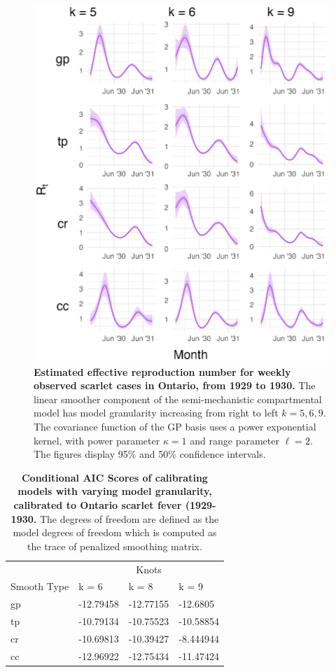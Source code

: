 \documentclass[
11pt, %
oneside, %
english, %
singlespacing, %
]{macthesis} %
\begin{document}
\begin{figure}[H]
\centering
\includegraphics[width=\textwidth, height = \textwidth]{figure/Scarlet/Scarlet_agg_k(5,8,10)_bsd1_beta1_gamma7_sd01_plot_R_t.png}
\caption[Estimated Scarlet Fever Effective Reproduction Number (1929-1930)]{\textbf{Estimated effective reproduction number for weekly observed scarlet cases in Ontario, from 1929 to 1930.} The linear smoother component of the semi-mechanistic compartmental model has model granularity increasing from right to left \(k= 5,6,9\). The covariance function of the GP basis uses a power exponential kernel, with power parameter \(\kappa = 1\) and range parameter \(\ell = 2\). The figures display 95\% and 50\% confidence intervals.}
\label{fig:scarlet_rt}
\end{figure}

\begin{table}[!h]
\centering
\caption{\label{tab:aic-table-scarlet}\textbf{Conditional AIC Scores of calibrating models with varying model granularity, calibrated to Ontario scarlet fever (1929-1930.} The degrees of freedom are defined as the model degrees of freedom which is computed as the trace of penalized smoothing matrix.}
\centering
\begin{tabular}[t]{llll}
\toprule
\multicolumn{1}{c}{ } & \multicolumn{3}{c}{Knots} \\
\cmidrule(l{3pt}r{3pt}){2-4}
Smooth Type & k = 6 & k = 8 & k = 9\\
\midrule
gp & -12.79458 & -12.77155 & -12.6805\\
tp & -10.79134 & -10.75523 & -10.58854\\
cr & -10.69813 & -10.39427 & -8.444944\\
cc & -12.96922 & -12.75434 & -11.47424\\
\bottomrule
\end{tabular}
\end{table}
\end{document}
